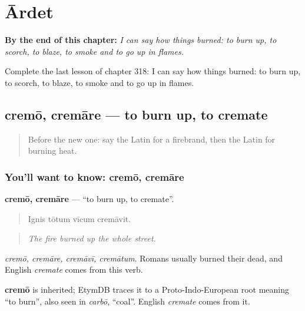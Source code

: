 
\chapter{Ārdet}
\label{ch:la-ardet}

\begin{chapteropening}
\textbf{By the end of this chapter:} \emph{I can say how things burned: to burn up, to scorch, to blaze, to smoke and to go up in flames.}

Complete the last lesson of chapter 318: I can say how things burned: to burn up, to scorch, to blaze, to smoke and to go up in flames.
\end{chapteropening}

\section[cremō, cremāre]{cremō, cremāre — to burn up, to cremate}

\label{lesson:LA-C318-cremo}



\begin{quote}
Before the new one: say the Latin for a firebrand, then the Latin for burning heat.
\end{quote}

\subsection*{You'll want to know: cremō, cremāre}
\textbf{cremō, cremāre} — \textquotedblleft{}to burn up, to cremate\textquotedblright{}.

\begin{quote}
Ignis tōtum vīcum cremāvit.
\end{quote}

\begin{quote}
\emph{The fire burned up the whole street.}
\end{quote}

\emph{cremō, cremāre, cremāvī, cremātum}. Romans usually burned their dead, and English \emph{cremate} comes from this verb.

\begin{cousinweb}
\textbf{cremō} is inherited; EtymDB traces it to a Proto-Indo-European root meaning \textquotedblleft{}to burn\textquotedblright{}, also seen in \emph{carbō}, \textquotedblleft{}coal\textquotedblright{}. English \emph{cremate} comes from it.
\end{cousinweb}

